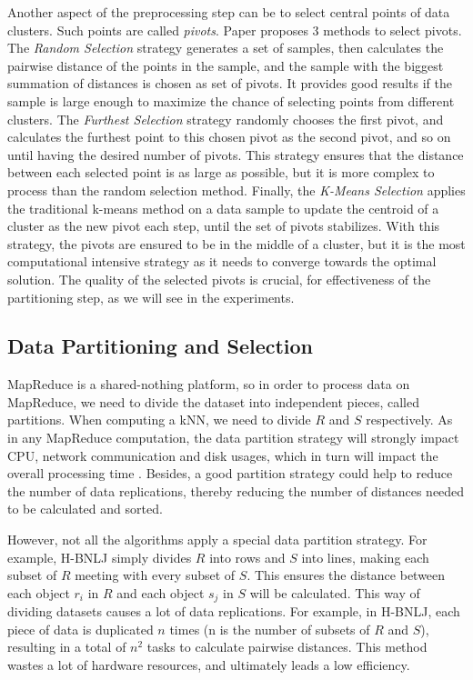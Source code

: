 \documentclass[10pt,journal,compsoc]{IEEEtran}
\begin{document}
Another aspect of the preprocessing step can be to select central points of data clusters. Such points are called 
\emph{pivots}. Paper \cite{Lu:2012:EPK:2336664.2336674} proposes 3 methods to select pivots. The \emph{Random 
Selection} strategy generates a set of samples, then calculates the pairwise distance of the points in the 
sample, and the sample with the biggest summation of distances is chosen as set of pivots. It 
provides good results if the sample is large enough to maximize the chance of selecting points from different 
clusters. The \emph{Furthest Selection} strategy randomly chooses the first pivot, and calculates the furthest 
point to this chosen pivot as the second pivot, and so on until having the desired number of pivots. This 
strategy ensures that the distance between each selected point is as large as possible, but it is more complex 
to process than the random selection method. Finally, the \emph{K-Means Selection} applies the traditional k-means 
method on a data sample to update the centroid of a cluster as the new pivot each step, until the set of 
pivots stabilizes. With this strategy, the pivots are ensured to be in the middle of a cluster, but it is 
the most computational intensive strategy as it needs to converge towards the optimal solution. The quality of 
the selected pivots is crucial, for effectiveness of the partitioning step, as we will see in the experiments.

%


\subsection{Data Partitioning and Selection}
\label{partitioning}

MapReduce is a shared-nothing platform, so in order to process data on MapReduce, we need to divide the dataset into independent pieces, 
called partitions. When computing a kNN, we need to divide $R$ and $S$ respectively.
As in any MapReduce computation, the data partition strategy will strongly impact CPU, network communication and disk usages, which in turn will impact the overall processing time \cite{DBLP:conf/hpcc/SongMHMYL13}. Besides, a good partition strategy could help to reduce the number of data replications, thereby reducing the number of distances needed to be calculated and sorted.

However, not all the algorithms apply a special data partition strategy. For example, H-BNLJ simply divides $R$ into rows and $S$ into lines, making each subset of $R$ meeting with every subset of $S$. This ensures the distance between each object $r_i$ in $R$ and each object $s_j$ in $S$ will be calculated. This way of dividing datasets causes a lot of data replications. For example, in H-BNLJ, each piece of data is duplicated $n$ times (n is the number of subsets of $R$ and $S$), resulting in a total of $n^2$ tasks to calculate pairwise distances. This method wastes a lot of hardware resources, and ultimately leads a low  efficiency.
\end{document}

